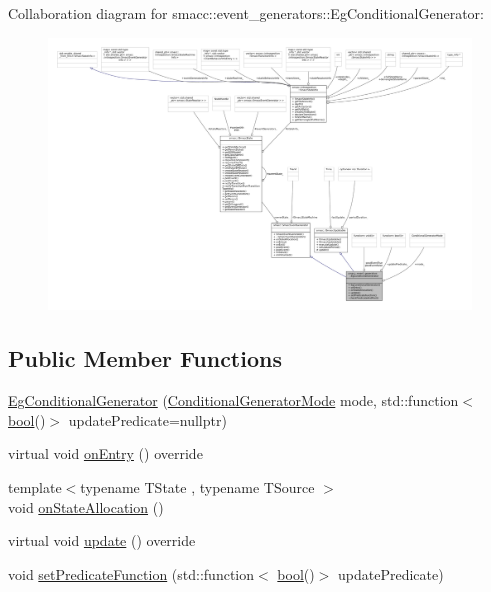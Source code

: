 Collaboration diagram for smacc\+:\+:event\+\_\+generators\+:\+:Eg\+Conditional\+Generator\+:
\nopagebreak
\begin{figure}[H]
\begin{center}
\leavevmode
\includegraphics[width=350pt]{classsmacc_1_1event__generators_1_1EgConditionalGenerator__coll__graph}
\end{center}
\end{figure}
\subsection*{Public Member Functions}
\begin{DoxyCompactItemize}
\item 
\hyperlink{classsmacc_1_1event__generators_1_1EgConditionalGenerator_aa21daec9774431387845be23fbcdfaa2}{Eg\+Conditional\+Generator} (\hyperlink{namespacesmacc_1_1event__generators_a1a57548759d7458f91c299f4fc2c5ea4}{Conditional\+Generator\+Mode} mode, std\+::function$<$ \hyperlink{classbool}{bool}()$>$ update\+Predicate=nullptr)
\item 
virtual void \hyperlink{classsmacc_1_1event__generators_1_1EgConditionalGenerator_ae3413453dceeabdf20cba6f1f19fc40c}{on\+Entry} () override
\item 
{\footnotesize template$<$typename T\+State , typename T\+Source $>$ }\\void \hyperlink{classsmacc_1_1event__generators_1_1EgConditionalGenerator_a08e70fdc7797e05189357286106d267d}{on\+State\+Allocation} ()
\item 
virtual void \hyperlink{classsmacc_1_1event__generators_1_1EgConditionalGenerator_ab5e500fd01fb21a7e6b836405431c6f2}{update} () override
\item 
void \hyperlink{classsmacc_1_1event__generators_1_1EgConditionalGenerator_a511e3afee28721cf1bd632bf9140003d}{set\+Predicate\+Function} (std\+::function$<$ \hyperlink{classbool}{bool}()$>$ update\+Predicate)
\end{DoxyCompactItemize}
